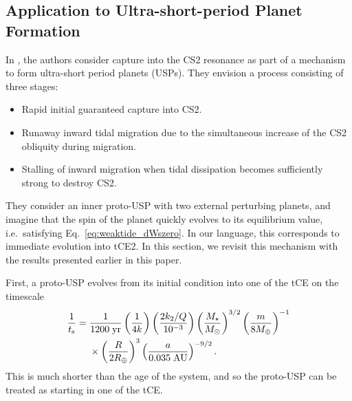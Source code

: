 \documentclass[
        fleqn,
        usenatbib,
    ]{mnras}
\newcommand*{\p}[1]{\left(#1\right)}
\begin{document}
\subsection{Application to Ultra-short-period Planet Formation
}\label{ss:disc_usp}

In \citet{millholland2020formation}, the authors consider capture into the CS2
resonance as part of a mechanism to form ultra-short period planets (USPs). They
envision a process consisting of three stages:
\begin{itemize}
    \item Rapid initial guaranteed capture into CS2.

    \item Runaway inward tidal migration due to the simultaneous increase of the
        CS2 obliquity during migration.

    \item Stalling of inward migration when tidal dissipation becomes
        sufficiently strong to destroy CS2.
\end{itemize}
They consider an inner proto-USP with two external perturbing planets, and
imagine that the spin of the planet quickly evolves to its equilibrium value,
i.e.\ satisfying Eq.~\eqref{eq:weaktide_dWszero}. In our language, this
corresponds to immediate evolution into tCE2. In this section, we revisit this
mechanism with the results presented earlier in this paper.

First, a proto-USP evolves from its initial condition into one of the tCE on the
timescale
\begin{align}
    \frac{1}{t_{\rm s}} ={}& \frac{1}{1200\;\mathrm{yr}}
            \p{\frac{1}{4k}}
            \p{\frac{2k_2/Q}{10^{-3}}}
            \p{\frac{M_\star}{M_{\odot}}}^{3/2}
            \p{\frac{m}{8 M_{\oplus}}}^{-1}\nonumber\\
        &\times \p{\frac{R}{2R_{\oplus}}}^3
            \p{\frac{a}{0.035\;\mathrm{AU}}}^{-9/2}.
\end{align}
This is much shorter than the age of the system, and so the proto-USP can be
treated as starting in one of the tCE\@.
\end{document}
